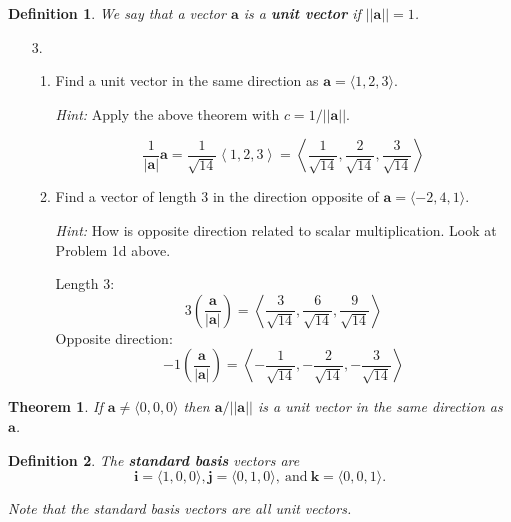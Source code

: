 \documentclass[12pt]{exam}
\newcommand{\gen}[1]{\left\langle #1 \right\rangle}
\newcommand{\ba}{\bm{a}}
\newtheorem*{definition}{Definition}
\newtheorem*{theorem}{Theorem}
\begin{document}
  \begin{definition}
    We say that a vector $\mathbf{a}$ is a \textbf{unit vector} if $||\mathbf{a}||=1$.
  \end{definition}

  \begin{enumerate}
    \item[3.]{
      \begin{enumerate}
        \item{
          Find a unit vector in the same direction as $\mathbf{a}=\langle 1,2,3\rangle$.
      
          \textit{Hint:}
          Apply the above theorem with $c=1/||\mathbf{a}||$.
        }

            \begin{solution}
            \[
                \dfrac{1}{|\ba|}\ba = \dfrac{1}{\sqrt{14}}\gen{1,2,3} = \gen{\dfrac{1}{\sqrt{14}},\dfrac{2}{\sqrt{14}},\dfrac{3}{\sqrt{14}}}
            \]
            \end{solution}
        
        \item{
          Find a vector of length $3$ in the direction opposite of $\mathbf{a}=\langle -2,4,1\rangle$.
          
          \textit{Hint:}
          How is opposite direction related to scalar multiplication.
          Look at Problem 1d above.
        }

            \begin{solution}
                Length 3:
                \[
                    3\left(\frac{\ba}{|\ba|}\right) = \gen{\dfrac{3}{\sqrt{14}},\dfrac{6}{\sqrt{14}},\dfrac{9}{\sqrt{14}}}
                \]
                Opposite direction:
                \[
                    -1\left(\frac{\ba}{|\ba|}\right) = \gen{-\dfrac{1}{\sqrt{14}},-\dfrac{2}{\sqrt{14}},-\dfrac{3}{\sqrt{14}}}
                \]
            \end{solution}
      \end{enumerate}
    }
  \end{enumerate}
  




  \begin{theorem}
    If $\mathbf{a}\neq\langle 0,0,0\rangle$ then $\mathbf{a}/||\mathbf{a}||$ is a unit vector in the same direction as $\mathbf{a}$.
  \end{theorem}
  
  \begin{definition}
    The \textbf{standard basis} vectors are
    \[
      \mathbf{i}=\langle 1,0,0\rangle, \mathbf{j}=\langle 0,1,0\rangle, \ \text{and} \ \mathbf{k}=\langle 0,0,1\rangle.
    \]
    
    Note that the standard basis vectors are all unit vectors.
  \end{definition}
  
\end{document}
